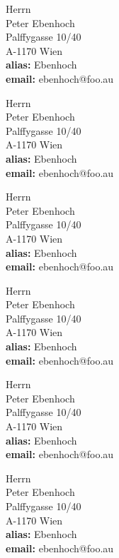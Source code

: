 



\parbox{8cm}{
Herrn \\
Peter Ebenhoch \\
Palffygasse 10/40 \\
A-1170 Wien \\
{\bf alias:} Ebenhoch  \\
{\bf email:} ebenhoch@foo.au \\ }


\parbox{8cm}{
Herrn \\
Peter Ebenhoch \\
Palffygasse 10/40 \\
A-1170 Wien \\
{\bf alias:} Ebenhoch  \\
{\bf email:} ebenhoch@foo.au \\ }

\parbox{8cm}{
Herrn \\
Peter Ebenhoch \\
Palffygasse 10/40 \\
A-1170 Wien \\
{\bf alias:} Ebenhoch  \\
{\bf email:} ebenhoch@foo.au \\ }

\parbox{8cm}{
Herrn \\
Peter Ebenhoch \\
Palffygasse 10/40 \\
A-1170 Wien \\
{\bf alias:} Ebenhoch  \\
{\bf email:} ebenhoch@foo.au \\ }

\parbox{8cm}{
Herrn \\
Peter Ebenhoch \\
Palffygasse 10/40 \\
A-1170 Wien \\
{\bf alias:} Ebenhoch  \\
{\bf email:} ebenhoch@foo.au \\ }

\parbox{8cm}{
Herrn \\
Peter Ebenhoch \\
Palffygasse 10/40 \\
A-1170 Wien \\
{\bf alias:} Ebenhoch  \\
{\bf email:} ebenhoch@foo.au \\ }

